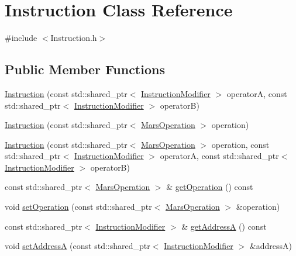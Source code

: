 \hypertarget{classInstruction}{}\section{Instruction Class Reference}
\label{classInstruction}


{\ttfamily \#include $<$Instruction.\+h$>$}

\subsection*{Public Member Functions}
\begin{DoxyCompactItemize}
\item 
\hyperlink{classInstruction_a8189c6e3e0caeaec698ae8053abf84b4}{Instruction} (const std\+::shared\+\_\+ptr$<$ \hyperlink{classInstructionModifier}{Instruction\+Modifier} $>$ operatorA, const std\+::shared\+\_\+ptr$<$ \hyperlink{classInstructionModifier}{Instruction\+Modifier} $>$ operatorB)
\item 
\hyperlink{classInstruction_ad1758d4d7afbf358e529e1ce5b199890}{Instruction} (const std\+::shared\+\_\+ptr$<$ \hyperlink{classMarsOperation}{Mars\+Operation} $>$ operation)
\item 
\hyperlink{classInstruction_a89efff676fc87ab4f831f4e7f4d574b9}{Instruction} (const std\+::shared\+\_\+ptr$<$ \hyperlink{classMarsOperation}{Mars\+Operation} $>$ operation, const std\+::shared\+\_\+ptr$<$ \hyperlink{classInstructionModifier}{Instruction\+Modifier} $>$ operatorA, const std\+::shared\+\_\+ptr$<$ \hyperlink{classInstructionModifier}{Instruction\+Modifier} $>$ operatorB)
\item 
const std\+::shared\+\_\+ptr$<$ \hyperlink{classMarsOperation}{Mars\+Operation} $>$ \& \hyperlink{classInstruction_a2cff68de6bb0e59aa8d32adb7c5a956a}{get\+Operation} () const
\item 
void \hyperlink{classInstruction_a6c3579495382c92ec38816636d2e98ef}{set\+Operation} (const std\+::shared\+\_\+ptr$<$ \hyperlink{classMarsOperation}{Mars\+Operation} $>$ \&operation)
\item 
const std\+::shared\+\_\+ptr$<$ \hyperlink{classInstructionModifier}{Instruction\+Modifier} $>$ \& \hyperlink{classInstruction_a2a21f6752465fd7d3401d43d57b7fa83}{get\+AddressA} () const
\item 
void \hyperlink{classInstruction_a3d0eeea6b5824a82518383e282550a39}{set\+AddressA} (const std\+::shared\+\_\+ptr$<$ \hyperlink{classInstructionModifier}{Instruction\+Modifier} $>$ \&addressA)
\item 

\end{DoxyCompactItemize}
